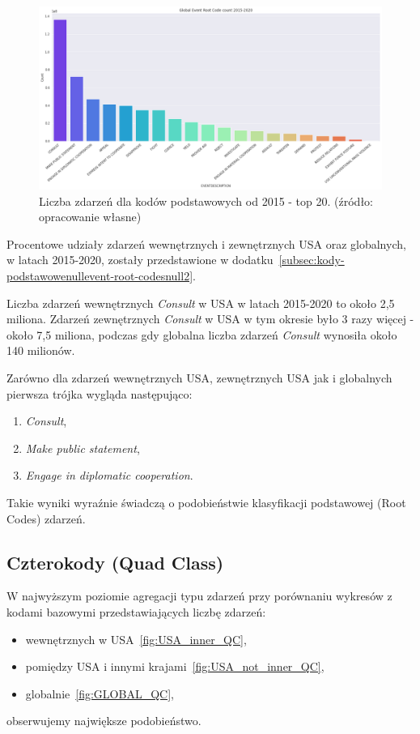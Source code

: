 \documentclass[11pt]{report}
\begin{document}
    \begin{figure}[!htp]
        \centering
        \includegraphics[width=\linewidth]{fig/GLOBAL//ERC.png}
        \caption{Liczba zdarzeń dla kodów podstawowych od 2015 - top 20. (źródło: opracowanie własne)}
        \label{fig:GLOBAL_ERC}
    \end{figure}

    Procentowe udziały zdarzeń wewnętrznych i zewnętrznych USA oraz globalnych, w latach 2015-2020, zostały przedstawione
    w dodatku~\ref{subsec:kody-podstawowenullevent-root-codesnull2}.

    Liczba zdarzeń wewnętrznych \textit{Consult} w USA w latach 2015-2020 to około 2,5 miliona.
    Zdarzeń zewnętrznych \textit{Consult} w USA w tym okresie było 3 razy więcej - około 7,5 miliona,
    podczas gdy globalna liczba zdarzeń \textit{Consult} wynosiła około 140 milionów.

    Zarówno dla zdarzeń wewnętrznych USA, zewnętrznych USA jak i globalnych pierwsza trójka wygląda następująco:
    \begin{enumerate}
        \item \textit{Consult},
        \item \textit{Make public statement},
        \item \textit{Engage in diplomatic cooperation}.
    \end{enumerate}

    Takie wyniki wyraźnie świadczą o podobieństwie klasyfikacji podstawowej (Root Codes) zdarzeń.

    \subsection{Czterokody (Quad Class)}\label{subsec:czterokodynullquad-classnull}

    W najwyższym poziomie agregacji typu zdarzeń przy porównaniu wykresów z kodami bazowymi przedstawiających liczbę zdarzeń:
    \begin{itemize}
        \item wewnętrznych w USA~\ref{fig:USA_inner_QC},
        \item pomiędzy USA i innymi krajami~\ref{fig:USA_not_inner_QC},
        \item globalnie~\ref{fig:GLOBAL_QC},
    \end{itemize}
    obserwujemy największe podobieństwo.
\end{document}
